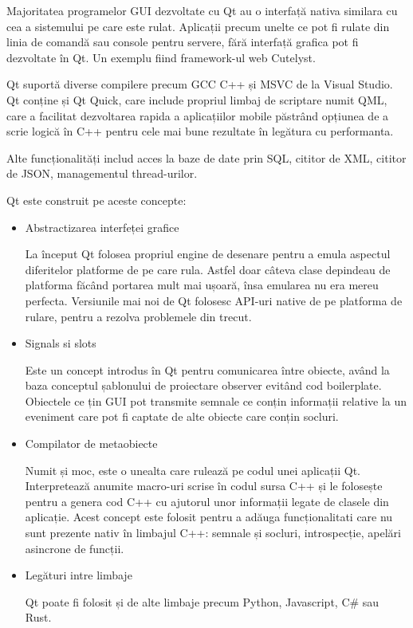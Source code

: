 Majoritatea programelor GUI dezvoltate cu Qt au o interfață nativa similara cu cea a sistemului pe care este rulat. 
Aplicații precum unelte ce pot fi rulate din linia de comandă sau console pentru servere, fără interfață grafica pot fi 
dezvoltate în Qt. Un exemplu fiind framework-ul web Cutelyst.\newline

Qt suportă diverse compilere precum GCC C++ și MSVC de la Visual Studio. Qt conține și Qt Quick, care include propriul 
limbaj de scriptare numit QML, care a facilitat dezvoltarea rapida a aplicațiilor mobile păstrând opțiunea de a scrie 
logică în C++ pentru cele mai bune rezultate în legătura cu performanta.\newline

Alte funcționalități includ acces la baze de date prin SQL, cititor de XML, cititor de JSON, managementul thread-urilor.\newline

Qt este construit pe aceste concepte:
\begin{itemize}
    \item Abstractizarea interfeței grafice
    
    La început Qt folosea propriul engine de desenare pentru a emula aspectul diferitelor platforme de pe care rula. 
    Astfel doar câteva clase depindeau de platforma făcând portarea mult mai ușoară, însa emularea nu era mereu perfecta. 
    Versiunile mai noi de Qt folosesc API-uri native de pe platforma de rulare, pentru a rezolva problemele din trecut.

    \item Signals si slots
    
    Este un concept introdus în Qt pentru comunicarea între obiecte, având la baza conceptul șablonului de proiectare observer 
    evitând cod boilerplate. Obiectele ce țin GUI pot transmite semnale ce conțin informații relative la un eveniment care pot 
    fi captate de alte obiecte care conțin socluri.

    \item Compilator de metaobiecte

    Numit și moc, este o unealta care rulează pe codul unei aplicații Qt. Interpretează anumite macro-uri scrise în codul 
    sursa C++ și le folosește pentru a genera cod C++ cu ajutorul unor informații legate de clasele din aplicație. 
    Acest concept este folosit pentru a adăuga funcționalitati care nu sunt prezente nativ în limbajul C++: semnale și socluri, 
    introspecție, apelări asincrone de funcții.

    \item Legături intre limbaje

    Qt poate fi folosit și de alte limbaje precum Python, Javascript, C\# sau Rust.
\end{itemize}

